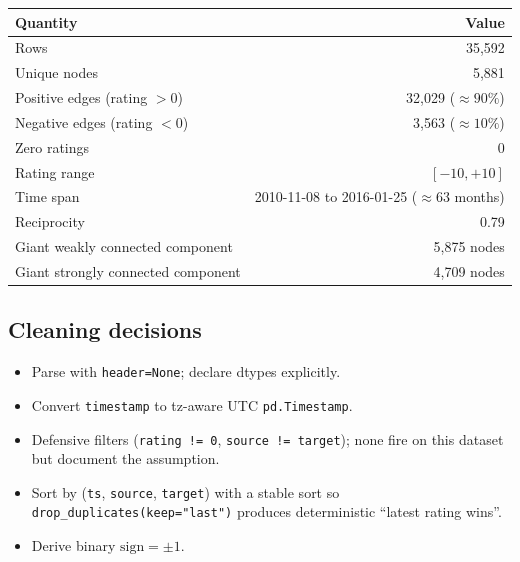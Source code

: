 \documentclass[11pt,a4paper]{article}
\newcommand{\code}[1]{\texttt{#1}}
\begin{document}
\begin{center}
\begin{tabular}{lr}
\toprule
Quantity & Value \\
\midrule
Rows                         & 35{,}592 \\
Unique nodes                 & 5{,}881 \\
Positive edges (rating $> 0$)& 32{,}029 ($\approx 90\%$) \\
Negative edges (rating $< 0$)& 3{,}563 ($\approx 10\%$) \\
Zero ratings                 & 0 \\
Rating range                 & $[-10, +10]$ \\
Time span                    & 2010-11-08 to 2016-01-25 ($\approx 63$ months) \\
Reciprocity                  & 0.79 \\
Giant weakly connected component & 5{,}875 nodes \\
Giant strongly connected component & 4{,}709 nodes \\
\bottomrule
\end{tabular}
\end{center}

\subsection{Cleaning decisions}
\begin{itemize}[nosep]
  \item Parse with \code{header=None}; declare dtypes explicitly.
  \item Convert \code{timestamp} to tz-aware UTC \code{pd.Timestamp}.
  \item Defensive filters (\code{rating != 0}, \code{source != target}); none
        fire on this dataset but document the assumption.
  \item Sort by (\code{ts}, \code{source}, \code{target}) with a stable sort
        so \code{drop\_duplicates(keep="last")} produces deterministic
        ``latest rating wins''.
  \item Derive binary $\mathrm{sign} = \pm 1$.
\end{itemize}
\end{document}
